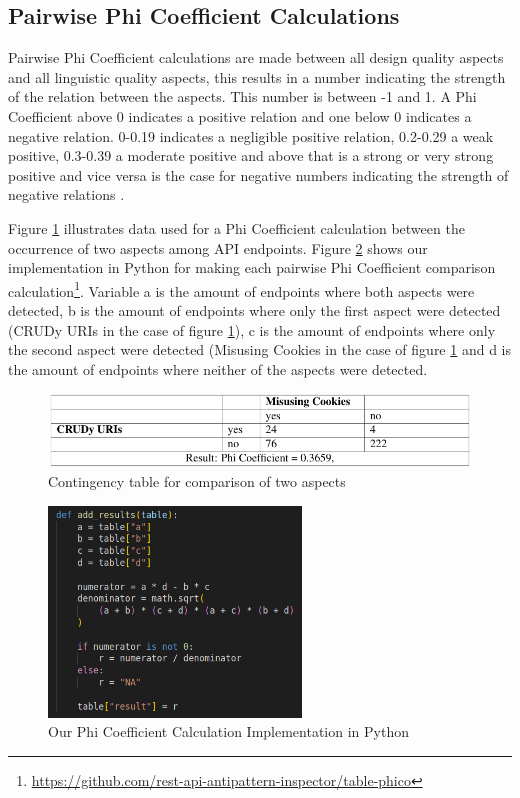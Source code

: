 \clearpage

\subsection{Pairwise Phi Coefficient Calculations}

Pairwise Phi Coefficient calculations are made between all design quality aspects and all linguistic quality aspects, this results in a number indicating the strength of the relation between the aspects. This number is between -1 and 1. A Phi Coefficient above 0 indicates a positive relation and one below 0 indicates a negative relation. 0-0.19 indicates a negligible positive relation, 0.2-0.29 a weak positive, 0.3-0.39 a moderate positive and above that is a strong or very strong positive and vice versa is the case for negative numbers indicating the strength of negative relations \cite{phico}. 

Figure \ref{fig:tableComparison} illustrates data used for a Phi Coefficient calculation between the occurrence of two aspects among API endpoints. Figure \ref{fig:phico} shows our implementation in Python for making each pairwise Phi Coefficient comparison calculation\footnote{\url{https://github.com/rest-api-antipattern-inspector/table-phico}}. Variable a is the amount of endpoints where both aspects were detected, b is the amount of endpoints where only the first aspect were detected (CRUDy URIs in the case of figure \ref{fig:tableComparison}), c is the amount of endpoints where only the second aspect were detected (Misusing Cookies in the case of figure \ref{fig:tableComparison} and d is the amount of endpoints where neither of the aspects were detected. 

\begin{figure}[!htb]
    \centering
    \includegraphics[width=1\textwidth]{img/CRUDy_vs_Cookies.png}
    \caption{Contingency table for comparison of two aspects}
    \label{fig:tableComparison}
\end{figure}

\begin{figure}[!htb]
    \centering
    \includegraphics[width=0.6\textwidth]{img/phico.png}
    \caption{Our Phi Coefficient Calculation Implementation in Python}
    \label{fig:phico}
\end{figure}

\newpage